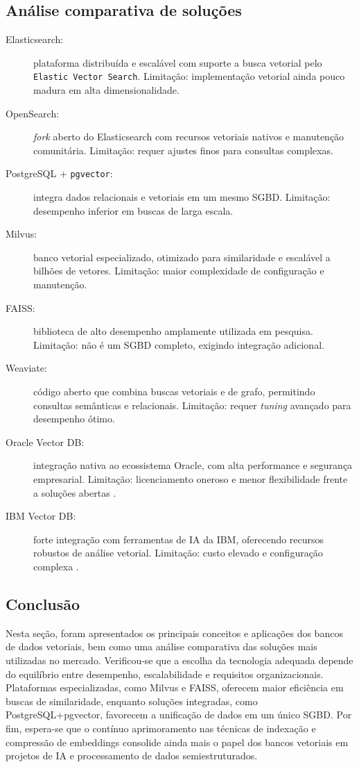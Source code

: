 \subsection{Análise comparativa de soluções}
\begin{description}
  \item[Elasticsearch:] plataforma distribuída e escalável com suporte a busca vetorial pelo \texttt{Elastic Vector Search}. Limitação: implementação vetorial ainda pouco madura em alta dimensionalidade.

  \item[OpenSearch:] \emph{fork} aberto do Elasticsearch com recursos vetoriais nativos e manutenção comunitária. Limitação: requer ajustes finos para consultas complexas.

  \item[PostgreSQL + \texttt{pgvector}:] integra dados relacionais e vetoriais em um mesmo SGBD. Limitação: desempenho inferior em buscas de larga escala.

  \item[Milvus:] banco vetorial especializado, otimizado para similaridade e escalável a bilhões de vetores. Limitação: maior complexidade de configuração e manutenção.

  \item[FAISS:] biblioteca de alto desempenho amplamente utilizada em pesquisa. Limitação: não é um SGBD completo, exigindo integração adicional.

  \item[Weaviate:] código aberto que combina buscas vetoriais e de grafo, permitindo consultas semânticas e relacionais. Limitação: requer \emph{tuning} avançado para desempenho ótimo.

  \item[Oracle Vector DB:] integração nativa ao ecossistema Oracle, com alta performance e segurança empresarial. Limitação: licenciamento oneroso e menor flexibilidade frente a soluções abertas \cite{oracle2025vector}.

  \item[IBM Vector DB:] forte integração com ferramentas de IA da IBM, oferecendo recursos robustos de análise vetorial. Limitação: custo elevado e configuração complexa \cite{ibm2025vector}.
  \end{description}

  \subsection{Conclusão}
    Nesta seção, foram apresentados os principais conceitos e aplicações dos bancos de dados vetoriais, bem como uma análise comparativa das soluções mais utilizadas no mercado. Verificou-se que a escolha da tecnologia adequada depende do equilíbrio entre desempenho, escalabilidade e requisitos organizacionais. Plataformas especializadas, como Milvus e FAISS, oferecem maior eficiência em buscas de similaridade, enquanto soluções integradas, como PostgreSQL+pgvector, favorecem a unificação de dados em um único SGBD. Por fim, espera-se que o contínuo aprimoramento nas técnicas de indexação e compressão de embeddings consolide ainda mais o papel dos bancos vetoriais em projetos de IA e processamento de dados semiestruturados.

